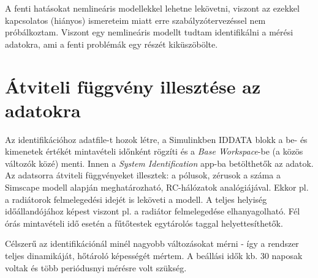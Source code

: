 A fenti hatásokat nemlineáris modellekkel lehetne lekövetni, viszont az ezekkel kapcsolatos (hiányos) ismereteim miatt erre szabályzótervezéssel nem próbálkoztam. Viszont egy nemlineáris modellt tudtam identifikálni a mérési adatokra, ami a fenti problémák egy részét kiküszöbölte.


\section{Átviteli függvény illesztése az adatokra}

Az identifikációhoz adatfile-t hozok létre, a Simulinkben IDDATA blokk a be- és kimenetek értékét mintavételi időnként rögzíti és a \textit{Base Workspace}-be (a közös változók közé) menti. Innen a \textit{System Identification} app-ba betölthetők az adatok. %
Az adatsorra átviteli függvényeket illesztek: a pólusok, zérusok a száma a Simscape modell alapján meghatározható, RC-hálózatok analógiájával. Ekkor pl. a radiátorok felmelegedési idejét is leköveti a modell. A teljes helyiség időállandójához képest viszont pl. a radiátor felmelegedése elhanyagolható. Fél órás mintavételi idő esetén a fűtőtestek egytárolós taggal helyettesíthetők. 




Célszerű az identifikációnál minél nagyobb változásokat mérni - így a rendszer teljes dinamikáját, hőtároló képességét mértem. A beállási idők kb. 30 naposak voltak és több periódusnyi mérésre volt szükség. 





